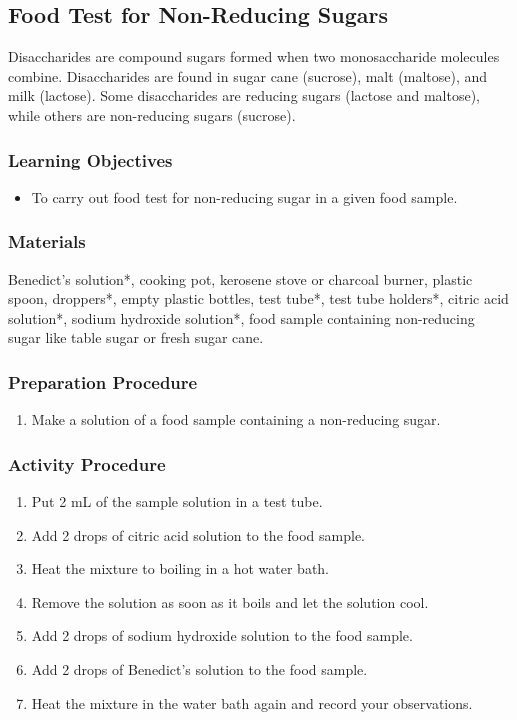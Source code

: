 \subsection{Food Test for Non-Reducing Sugars}
Disaccharides are compound sugars formed when two monosaccharide molecules combine. Disaccharides are found in sugar cane (sucrose), malt (maltose), and milk (lactose). Some disaccharides are reducing sugars (lactose and maltose), while others are non-reducing sugars (sucrose).

\subsubsection*{Learning Objectives}
\begin{itemize}
\item{To carry out food test for non-reducing sugar in a given food sample.}
\end{itemize}

\subsubsection*{Materials}
Benedict's solution*, cooking pot, kerosene stove or charcoal burner, plastic spoon, droppers*, empty plastic bottles, test tube*, test tube holders*, citric acid solution*, sodium hydroxide solution*, food sample containing non-reducing sugar like table sugar or fresh sugar cane.

\subsubsection*{Preparation Procedure}
\begin{enumerate}
\item{Make a solution of a food sample containing a non-reducing sugar.}
\end{enumerate}

\subsubsection*{Activity Procedure}
\begin{enumerate}
\item{Put 2 mL of the sample solution in a test tube.}
\item{Add 2 drops of citric acid solution to the food sample.}
\item{Heat the mixture to boiling in a hot water bath.}
\item{Remove the solution as soon as it boils and let the solution cool.}
\item{Add 2 drops of sodium hydroxide solution to the food sample.}
\item{Add 2 drops of Benedict's solution to the food sample.}
\item{Heat the mixture in the water bath again and record your observations.}
\end{enumerate}

